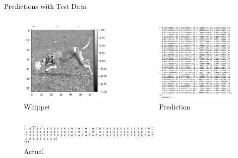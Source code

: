 \documentclass[leqno]{beamer}
\begin{document}
\begin{frame}{Predictions with Test Data}
    \begin{columns}
        \begin{column}{0.45\textwidth}
            \begin{figure}
                \includegraphics[height=4cm]{correctDog.jpg}
                \caption{Whippet}
            \end{figure}
        \end{column}
        \begin{column}{0.45\textwidth}
            \begin{figure}
                \includegraphics[height=4cm]{correctPredict.jpg}
                \caption{Prediction}
            \end{figure}
        \end{column}
    \end{columns}
    \begin{figure}
        \includegraphics[height=1cm]{correctActual.jpg}
        \caption{Actual}
    \end{figure}
\end{frame}
\end{document}
